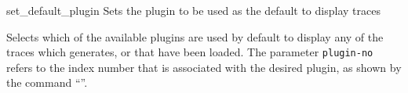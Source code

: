 \begin{nusmvCommand} {set\_default\_plugin} {Sets the plugin to be
    used as the default to display traces}


\begin{cmdOpt}
\end{cmdOpt}

Selects which of the available plugins are used by default to display
any of the traces which \nusmv generates, or that have been
loaded. The parameter \texttt{plugin-no} refers to the index number
that is associated with the desired plugin, as shown by the command
``''.

\end{nusmvCommand}
